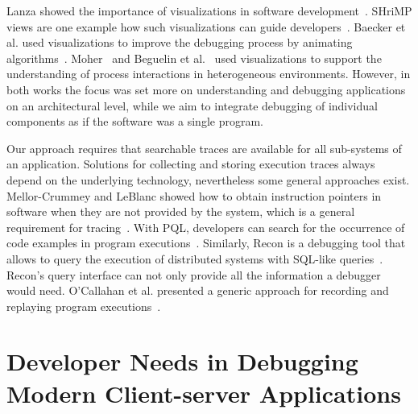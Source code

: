 \documentclass[
      english,
			conference,
      ]{IEEEtran}
\begin{document}
Lanza showed the importance of visualizations in software development~\cite{lanza2003program}.
SHriMP views are one example how such visualizations can guide developers~\cite{storey2002shrimp}.
Baecker et al. used visualizations to improve the debugging process by animating algorithms~\cite{baecker1997software}.
Moher~\cite{moher1988provide} and Beguelin et al.~\cite{beguelin1993visualization} used visualizations to support the understanding of process interactions in heterogeneous environments.
However, in both works the focus was set more on understanding and debugging applications on an architectural level, while we aim to integrate debugging of individual components as if the software was a single program.

Our approach requires that searchable traces are available for all sub-systems of an application.
Solutions for collecting and storing execution traces always depend on the underlying technology, nevertheless some general approaches exist.
Mellor-Crummey and LeBlanc showed how to obtain instruction pointers in software when they are not provided by the system, which is a general requirement for tracing~\cite{mellor-crummey_software_1989}.
With PQL, developers can search for the occurrence of code examples in program executions~\cite{martin_finding_2005}.
Similarly, Recon is a debugging tool that allows to query the execution of distributed systems with SQL-like queries~\cite{lee_unified_2011}.
Recon's query interface can not only provide all the information a debugger would need.
O'Callahan et al. presented a generic approach for recording and replaying program executions~\cite{ocallahan_engineering_2017}.




\section{Developer Needs in Debugging Modern Client-server Applications}
\label{sec:interviews}
\end{document}

